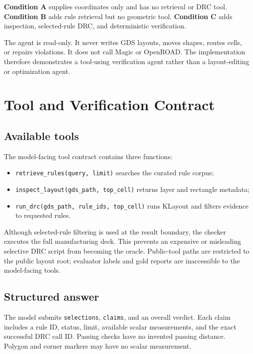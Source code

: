 \documentclass[10pt,twocolumn]{article}
\begin{document}
\textbf{Condition A} supplies coordinates only and has no retrieval or DRC tool.
\textbf{Condition B} adds rule retrieval but no geometric tool. \textbf{Condition C}
adds inspection, selected-rule DRC, and deterministic verification.

The agent is read-only. It never writes GDS layouts, moves shapes, routes cells,
or repairs violations. It does not call Magic or OpenROAD. The implementation
therefore demonstrates a tool-using verification agent rather than a layout-editing
or optimization agent.

\clearpage
\section{Tool and Verification Contract}
\subsection{Available tools}
The model-facing tool contract contains three functions:
\begin{itemize}[leftmargin=*,itemsep=1pt]
\item \texttt{retrieve\_rules(query, limit)} searches the curated rule corpus;
\item \texttt{inspect\_layout(gds\_path, top\_cell)} returns layer and rectangle metadata;
\item \texttt{run\_drc(gds\_path, rule\_ids, top\_cell)} runs KLayout and filters evidence
      to requested rules.
\end{itemize}

Although selected-rule filtering is used at the result boundary, the checker executes
the full manufacturing deck. This prevents an expensive or misleading selective DRC
script from becoming the oracle. Public-tool paths are restricted to the public layout
root; evaluator labels and gold reports are inaccessible to the model-facing tools.

\subsection{Structured answer}
The model submits \texttt{selections}, \texttt{claims}, and an overall verdict.
Each claim includes a rule ID, status, limit, available scalar measurements, and
the exact successful DRC call ID. Passing checks have no invented passing distance.
Polygon and corner markers may have no scalar measurement.
\end{document}
